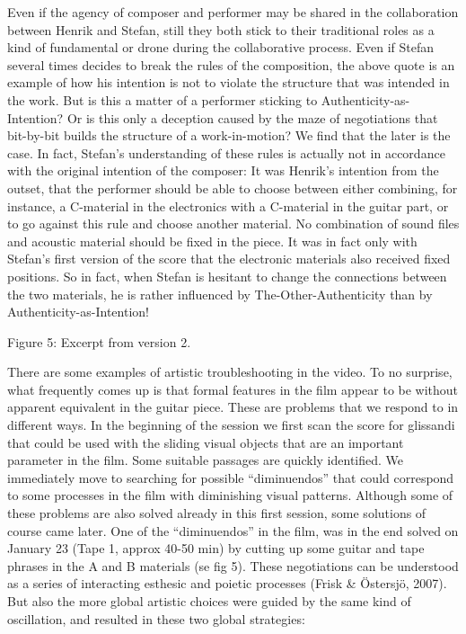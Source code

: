  
Even if the agency of composer and performer may be shared in the
collaboration between Henrik and Stefan, still they both stick to
their traditional roles as a kind of fundamental or drone during the
collaborative process. Even if Stefan several times decides to break
the rules of the composition, the above quote is an example of how his
intention is not to violate the structure that was intended in the
work. But is this a matter of a performer sticking to
Authenticity-as-Intention? Or is this only a deception caused by the
maze of negotiations that bit-by-bit builds the structure of a
work-in-motion? We find that the later is the case. In fact, Stefan's
understanding of these rules is actually not in accordance with the
original intention of the composer: It was Henrik's intention from the
outset, that the performer should be able to choose between either
combining, for instance, a C-material in the electronics with a
C-material in the guitar part, or to go against this rule and choose
another material. No combination of sound files and acoustic material
should be fixed in the piece. It was in fact only with Stefan's first
version of the score that the electronic materials also received fixed
positions. So in fact, when Stefan is hesitant to change the
connections between the two materials, he is rather influenced by
The-Other-Authenticity than by Authenticity-as-Intention!
 


Figure 5: Excerpt from version 2.


There are some examples of artistic troubleshooting in the video. To
no surprise, what frequently comes up is that formal features in the
film appear to be without apparent equivalent in the guitar
piece. These are problems that we respond to in different ways. In the
beginning of the session we first scan the score for glissandi that
could be used with the sliding visual objects that are an important
parameter in the film. Some suitable passages are quickly
identified. We immediately move to searching for possible
``diminuendos'' that could correspond to some processes in the film
with diminishing visual patterns. Although some of these problems are
also solved already in this first session, some solutions of course
came later. One of the ``diminuendos'' in the film, was in the end
solved on January 23 (Tape 1, approx 40-50 min) by cutting up some
guitar and tape phrases in the A and B materials (se fig 5). These
negotiations can be understood as a series of interacting esthesic and
poietic processes (Frisk \& \"{O}stersj\"{o}, 2007). But also the more
global artistic choices were guided by the same kind of oscillation,
and resulted in these two global strategies:
 
